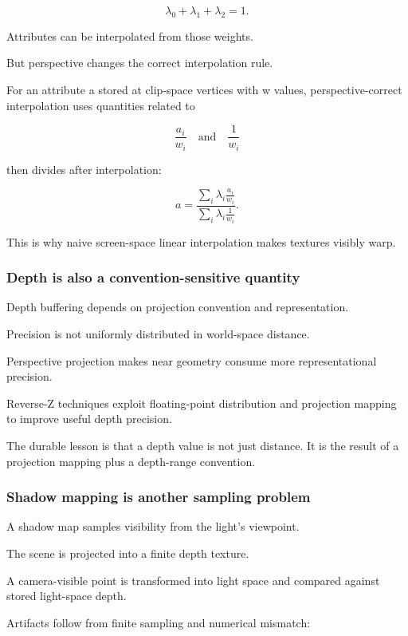\[
\lambda_0+\lambda_1+\lambda_2=1.
\]

Attributes can be interpolated from those weights.

But perspective changes the correct interpolation rule.

For an attribute a stored at clip-space vertices with w values, perspective-correct interpolation uses quantities related to

\[
\frac{a_i}{w_i}
\quad\text{and}\quad
\frac{1}{w_i}
\]

then divides after interpolation:

\[
a
=
\frac{
\sum_i \lambda_i \frac{a_i}{w_i}
}{
\sum_i \lambda_i \frac{1}{w_i}
}.
\]

This is why naive screen-space linear interpolation makes textures visibly warp.

\subsubsection{Depth is also a convention-sensitive quantity}\label{03-visual-computing-i-ch001-depth-is-also-a-convention-sensitive-quantity}

Depth buffering depends on projection convention and representation.

Precision is not uniformly distributed in world-space distance.

Perspective projection makes near geometry consume more representational precision.

Reverse-Z techniques exploit floating-point distribution and projection mapping to improve useful depth precision.

The durable lesson is that a depth value is not just distance. It is the result of a projection mapping plus a depth-range convention.

\subsubsection{Shadow mapping is another sampling problem}\label{03-visual-computing-i-ch001-shadow-mapping-is-another-sampling-problem}

A shadow map samples visibility from the light's viewpoint.

The scene is projected into a finite depth texture.

A camera-visible point is transformed into light space and compared against stored light-space depth.

Artifacts follow from finite sampling and numerical mismatch:

